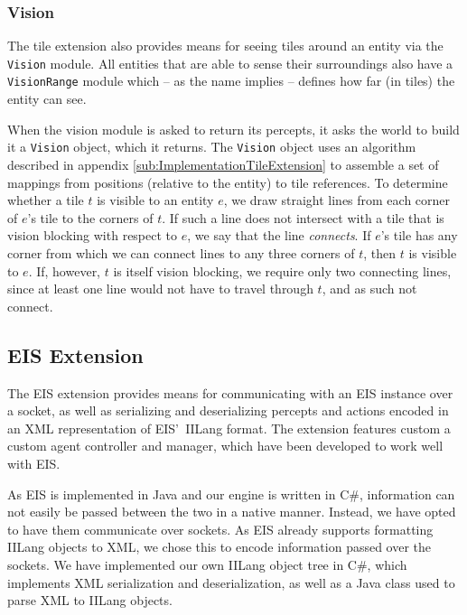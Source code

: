 \subsubsection*{Vision}

The tile extension also provides means for seeing tiles around an
entity via the \texttt{Vision} module. All entities that are able
to sense their surroundings also have a \texttt{VisionRange} module
which -- as the name implies -- defines how far (in tiles) the entity
can see.

When the vision module is asked to return its percepts, it asks the
world to build it a \texttt{Vision} object, which it returns. The
\texttt{Vision} object uses an algorithm described in appendix \ref{sub:ImplementationTileExtension}
to assemble a set of mappings from positions (relative to the entity)
to tile references. To determine whether a tile $t$ is visible to
an entity $e$, we draw straight lines from each corner of $e$'s
tile to the corners of $t$. If such a line does not intersect with
a tile that is vision blocking with respect to $e$, we say that the
line \emph{connects}. If $e$'s tile has any corner from which we
can connect lines to any three corners of $t$, then $t$ is visible
to $e$. If, however, $t$ is itself vision blocking, we require only
two connecting lines, since at least one line would not have to travel
through $t$, and as such not connect.


\subsection{EIS Extension\label{sub:EIS-Extension}}

The EIS extension provides means for communicating with an EIS instance
over a socket, as well as serializing and deserializing percepts and
actions encoded in an XML representation of EIS'\texttt{ }IILang format.
The extension features custom a custom agent controller and manager,
which have been developed to work well with EIS. 

As EIS is implemented in Java and our engine is written in C\#, information
can not easily be passed between the two in a native manner. Instead,
we have opted to have them communicate over sockets. As EIS already
supports formatting IILang objects to XML, we chose this to encode
information passed over the sockets. We have implemented our own IILang
object tree in C\#, which implements XML serialization and deserialization,
as well as a Java class used to parse XML to IILang objects. 

